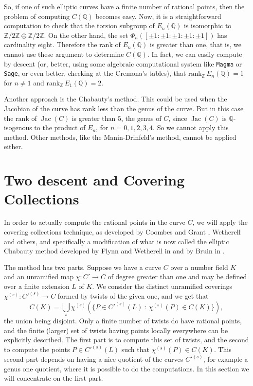 \documentclass[a4paper,12pt]{amsart}
\theoremstyle{remark}
\theoremstyle{definition}
\begin{document}
So, if one of such elliptic curves have a finite number of
rational points, then the problem of computing $C({{\mathbb{Q}}})$ becomes
easy. Now, it is a straightforward computation to check that the
torsion subgroup of $E_n({{\mathbb{Q}}})$ is isomorphic to
${{\mathbb{Z}}}/2{{\mathbb{Z}}}\oplus{{\mathbb{Z}}}/2{{\mathbb{Z}}}$. On the other hand, the set $\Phi_n([\pm
1:\pm 1:\pm 1:\pm 1:\pm 1])$ has cardinality eight. Therefore the
rank of  $E_n({{\mathbb{Q}}})$ is greater than one, that is, we cannot use
these argument to determine $C({{\mathbb{Q}}})$.  In fact, we can easily
compute by descent (or, better, using some algebraic computational
system like \verb+Magma+ or \verb+Sage+, or even better, checking
at the Cremona's tables), that $\mbox{rank}_{{\mathbb{Z}}}\, E_n({{\mathbb{Q}}})=1$ for
$n\ne 1$ and $\mbox{rank}_{{\mathbb{Z}}}\, E_1({{\mathbb{Q}}})=2$.

Another approach is the Chabauty's method. This could be used when
the Jacobian of the curve has rank less than the genus of the
curve. But in this case the rank  of $\operatorname{Jac}(C)$ is greater than
$5$, the genus of $C$, since  $\operatorname{Jac}(C)$ is ${{\mathbb{Q}}}$-isogenous to the
product of $E_n$, for $n=0,1,2,3,4$. So we cannot apply this
method. Other methods, like the Manin-Drinfeld's method, cannot be
applied either.

\section{Two descent and Covering Collections}

In order to actually compute the rational points in the curve $C$,
we will apply the covering collections technique, as developed by
Coombes and Grant \cite{CG}, Wetherell \cite{We} and others, and
specifically a modification of what is now called the elliptic
Chabauty method developed by  Flynn and Wetherell in \cite{FW} and
by Bruin in \cite{Br}.

The method has two parts. Suppose we have a curve $C$ over a
number field $K$ and an unramified map $\chi:C'\to C$ of degree
greater than one and may be defined over a finite extension $L$ of
$K$. We consider the distinct unramified coverings
$\chi^{(s)}:C'^{(s)}\to C$ formed by twists of the given one, and
we get that
$$C(K)=\bigcup_{s} \chi^{(s)}(\{P\in C'^{(s)}(L)\ : \ \chi^{(s)}(P)\in C(K)\}) ,$$
the union being disjoint. Only a finite number of twists do have
rational points, and the finite (larger) set of twists having
points locally everywhere can be explicitly described. The first
part is to compute this set of twists, and the second to compute
the points $ P\in C'^{(s)}(L)$ such that $\chi^{(s)}(P)\in C(K)$.
This second part depends on having a nice quotient of the curves
$C'^{(s)}$, for example a genus one quotient, where it is possible
to do the computations. In this section we will concentrate on the
first part.
\end{document}
